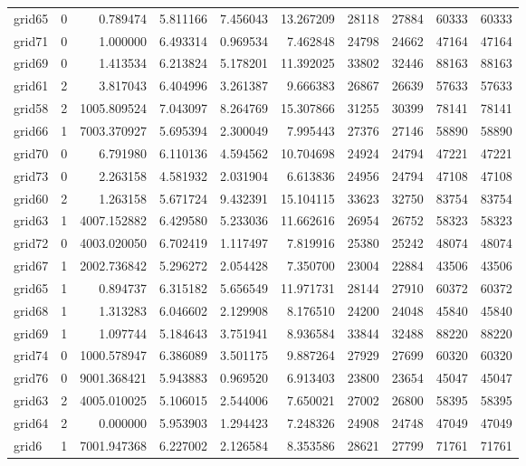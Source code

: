 \begin{longtable}{|l|r|r|r|r|r|r|r|r|r|}
grid65 & 0 & 0.789474 & 5.811166 & 7.456043 & 13.267209 & 28118 & 27884 & 60333 & 60333 \\
grid71 & 0 & 1.000000 & 6.493314 & 0.969534 & 7.462848 & 24798 & 24662 & 47164 & 47164 \\
grid69 & 0 & 1.413534 & 6.213824 & 5.178201 & 11.392025 & 33802 & 32446 & 88163 & 88163 \\
grid61 & 2 & 3.817043 & 6.404996 & 3.261387 & 9.666383 & 26867 & 26639 & 57633 & 57633 \\
grid58 & 2 & 1005.809524 & 7.043097 & 8.264769 & 15.307866 & 31255 & 30399 & 78141 & 78141 \\
grid66 & 1 & 7003.370927 & 5.695394 & 2.300049 & 7.995443 & 27376 & 27146 & 58890 & 58890 \\
grid70 & 0 & 6.791980 & 6.110136 & 4.594562 & 10.704698 & 24924 & 24794 & 47221 & 47221 \\
grid73 & 0 & 2.263158 & 4.581932 & 2.031904 & 6.613836 & 24956 & 24794 & 47108 & 47108 \\
grid60 & 2 & 1.263158 & 5.671724 & 9.432391 & 15.104115 & 33623 & 32750 & 83754 & 83754 \\
grid63 & 1 & 4007.152882 & 6.429580 & 5.233036 & 11.662616 & 26954 & 26752 & 58323 & 58323 \\
grid72 & 0 & 4003.020050 & 6.702419 & 1.117497 & 7.819916 & 25380 & 25242 & 48074 & 48074 \\
grid67 & 1 & 2002.736842 & 5.296272 & 2.054428 & 7.350700 & 23004 & 22884 & 43506 & 43506 \\
grid65 & 1 & 0.894737 & 6.315182 & 5.656549 & 11.971731 & 28144 & 27910 & 60372 & 60372 \\
grid68 & 1 & 1.313283 & 6.046602 & 2.129908 & 8.176510 & 24200 & 24048 & 45840 & 45840 \\
grid69 & 1 & 1.097744 & 5.184643 & 3.751941 & 8.936584 & 33844 & 32488 & 88220 & 88220 \\
grid74 & 0 & 1000.578947 & 6.386089 & 3.501175 & 9.887264 & 27929 & 27699 & 60320 & 60320 \\
grid76 & 0 & 9001.368421 & 5.943883 & 0.969520 & 6.913403 & 23800 & 23654 & 45047 & 45047 \\
grid63 & 2 & 4005.010025 & 5.106015 & 2.544006 & 7.650021 & 27002 & 26800 & 58395 & 58395 \\
grid64 & 2 & 0.000000 & 5.953903 & 1.294423 & 7.248326 & 24908 & 24748 & 47049 & 47049 \\
grid6 & 1 & 7001.947368 & 6.227002 & 2.126584 & 8.353586 & 28621 & 27799 & 71761 & 71761 \\

\end{longtable}

